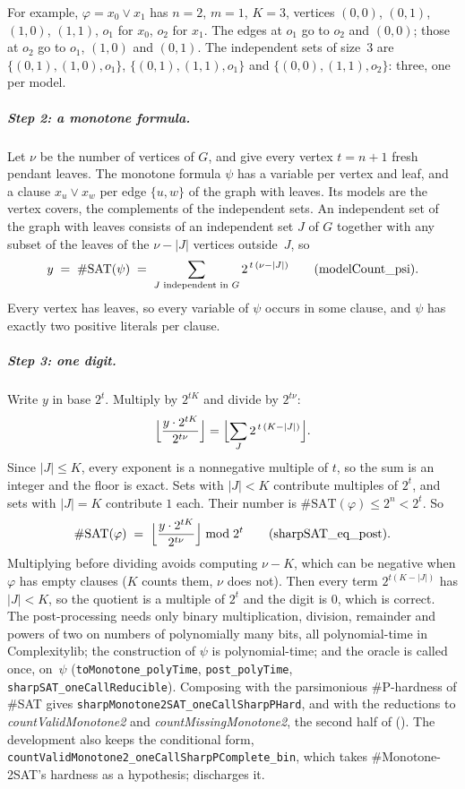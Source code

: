 \documentclass[pdflatex,sn-mathphys-num]{sn-jnl}
\theoremstyle{thmstyleone}
\theoremstyle{thmstylethree}
\begin{document}
For example, $\varphi = x_0 \lor x_1$ has $n = 2$, $m = 1$, $K = 3$, vertices $(0,0)$,
$(0,1)$, $(1,0)$, $(1,1)$, $o_1$ for $x_0$, $o_2$ for $x_1$. The edges at $o_1$ go to $o_2$ and
$(0,0)$; those at $o_2$ go to $o_1$, $(1,0)$ and $(0,1)$. The independent sets of size~3 are
$\{(0,1), (1,0), o_1\}$, $\{(0,1), (1,1), o_1\}$ and $\{(0,0), (1,1), o_2\}$: three, one per model.

\subparagraph*{Step 2: a monotone formula.}
Let $\nu$ be the number of vertices of $G$, and give every vertex $t = n + 1$ fresh pendant
leaves. The monotone formula $\psi$ has a variable per vertex and leaf, and a clause $x_u \lor
x_w$ per edge $\{u, w\}$ of the graph with leaves. Its models are the vertex covers, the
complements of the independent sets. An independent set of the graph with leaves consists of an
independent set $J$ of $G$ together with any subset of the leaves of the $\nu - |J|$ vertices
outside~$J$, so
\[
y \;=\; \#\mathrm{SAT}(\psi) \;=\; \sum_{J \text{ independent in } G} 2^{\,t\,(\nu - |J|)}
\qquad (\text{\lstinline{modelCount_psi}}).
\]
Every vertex has leaves, so every variable of $\psi$ occurs in some clause, and $\psi$ has exactly two
positive literals per clause.

\subparagraph*{Step 3: one digit.}
Write $y$ in base $2^t$. Multiply by $2^{tK}$ and divide by $2^{t\nu}$:
\[
\Bigl\lfloor \frac{y \cdot 2^{tK}}{2^{t\nu}} \Bigr\rfloor
= \Bigl\lfloor \sum_{J} 2^{\,t\,(K - |J|)} \Bigr\rfloor .
\]
Since $|J| \le K$, every exponent is a nonnegative multiple of $t$, so the sum is an integer and
the floor is exact. Sets with $|J| < K$ contribute multiples of $2^t$, and sets with $|J| = K$
contribute $1$ each. Their number is $\#\mathrm{SAT}(\varphi) \le 2^n < 2^t$. So
\[
\#\mathrm{SAT}(\varphi) \;=\; \Bigl\lfloor \frac{y \cdot 2^{tK}}{2^{t\nu}} \Bigr\rfloor \bmod 2^t
\qquad (\text{\lstinline{sharpSAT_eq_post}}).
\]
Multiplying before dividing avoids computing $\nu - K$, which can be negative when $\varphi$ has
empty clauses ($K$ counts them, $\nu$ does not). Then every term $2^{t(K-|J|)}$ has $|J| < K$, so the
quotient is a multiple of $2^t$ and the digit is $0$, which is correct.
The post-processing needs only binary multiplication, division, remainder and powers of two on
numbers of polynomially many bits, all polynomial-time in Complexitylib; the construction of
$\psi$ is polynomial-time; and the oracle is called once, on~$\psi$
(\lstinline{toMonotone_polyTime}, \lstinline{post_polyTime}, \lstinline{sharpSAT_oneCallReducible}).
Composing with the parsimonious \#P-hardness of \#SAT gives
\lstinline{sharpMonotone2SAT_oneCallSharpPHard}, and with the reductions to
\textit{countValidMonotone2} and \textit{countMissingMonotone2}, the second half of
 (). The development also keeps
the conditional form, \lstinline{countValidMonotone2_oneCallSharpPComplete_bin}, which takes
\#Monotone-2SAT's hardness as a hypothesis;  discharges it.
\end{document}
